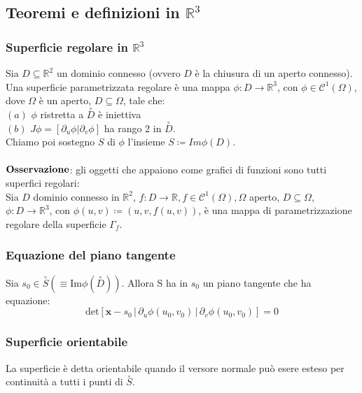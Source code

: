 \documentclass{article} %
\begin{document}
    \subsection{Teoremi e definizioni in $\mathbb{R}^3$}

    \subsubsection*{Superficie regolare in $\mathbb{R}^3$}
    Sia $D \subseteq \mathbb{R}^2$ un dominio connesso (ovvero $D$ è la chiusura di un aperto connesso). Una superficie parametrizzata regolare è una mappa $\phi: D \to \mathbb{R}^3$, con $\phi \in \mathcal{C}^1 (\Omega)$, dove $\Omega$ è un aperto, $D \subseteq \Omega$, tale che: \\
    $(a)$ $\phi$ ristretta a $\overset{\circ}{D}$ è iniettiva \\
    $(b)$ $J \phi = \left[ \partial_u \phi | \partial_v \phi \right]$ ha rango 2 in $\overset{\circ}{D}$. \\
    Chiamo poi sostegno $S$ di $\phi$ l'insieme $S \coloneqq Im \phi(D)$. \\ \\
    $\bf{Osservazione}$: gli oggetti che appaiono come grafici di funzioni sono tutti superfici regolari: \\
    Sia $D$ dominio connesso in $\mathbb{R}^2$, $f: D \to  \mathbb{R}, f \in \mathcal{C}^1 (\Omega), \Omega$ aperto, $D \subseteq \Omega$, $\phi: D \to \mathbb{R}^3$, con $\phi(u,v) \coloneqq ( u, v , f(u,v))$, è una mappa di parametrizzazione regolare della superficie $\Gamma_f$.

    \subsubsection*{Equazione del piano tangente}
    Sia $s_0 \in \overset{\circ}{S} \left(\equiv \text{Im} \phi\left(\overset{\circ}{D}\right)\right)$. Allora S ha in $s_0$ un piano tangente che ha equazione:
    $$ \text{det} \left[{ \mathbf{x}} - s_0 \, | \, \partial_u \phi (u_0, v_0) \, | \, \partial_v \phi (u_0, v_0) \right] = 0$$

    \subsubsection*{Superficie orientabile}
    La superficie è detta orientabile quando il versore normale può esere esteso per continuità a tutti i punti di $\overset{\circ}{S}$.
\end{document}
